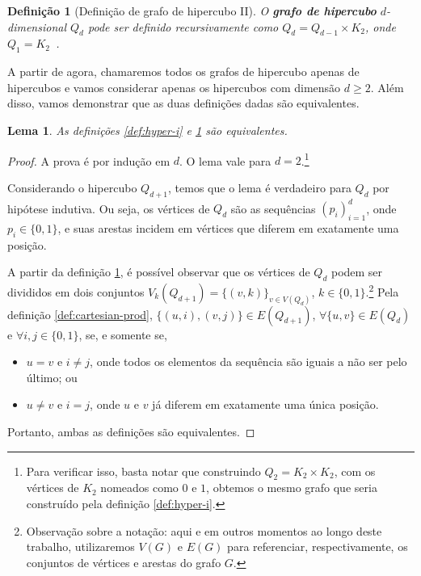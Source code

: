 \documentclass[12pt, a4paper]{article}
\newtheorem{definition}{Definição}[section]
\newtheorem{lemma}{Lema}[section]
\begin{document}
\begin{definition}[Definição de grafo de hipercubo II] \label{def:hyper-ii}
    O {\bf grafo de hipercubo} $d$-dimensional $Q_d$ pode ser definido recursivamente como $Q_d = Q_{d - 1} \times K_2$, onde $Q_1 = K_2$~\cite{harary_survey_1988}.
\end{definition}

A partir de agora, chamaremos todos os grafos de hipercubo apenas de hipercubos e vamos considerar apenas os hipercubos com dimensão $d \geq 2$. Além disso, vamos demonstrar que as duas definições dadas são equivalentes.

\begin{lemma}\label{lemma:equiv_def}
As definições \ref{def:hyper-i} e \ref{def:hyper-ii} são equivalentes.
\end{lemma}

\begin{proof}
        A prova é por indução em $d$. O lema vale para $d = 2$.\footnote{Para verificar isso, basta notar que construindo $Q_2 = K_2 \times K_2$, com os vértices de $K_2$ nomeados como $0$ e $1$, obtemos o mesmo grafo que seria construído pela definição \ref{def:hyper-i}.}

        Considerando o hipercubo $Q_{d + 1}$, temos que o lema é verdadeiro para $Q_d$ por hipótese indutiva. Ou seja, os vértices de $Q_d$ são as sequências $(p_i)_{i=1}^{d}$, onde $p_i \in \{ 0, 1 \}$, e suas arestas incidem em vértices que diferem em exatamente uma posição.

        A partir da definição \ref{def:hyper-ii}, é possível observar que os vértices de $Q_d$ podem ser divididos em dois conjuntos $V_k(Q_{d + 1}) = \{ (v, k) \}_{v \in V(Q_d)}$, $k \in \{ 0, 1 \}$.\footnote{Observação sobre a notação: aqui e em outros momentos ao longo deste trabalho, utilizaremos $V(G)$ e $E(G)$ para referenciar, respectivamente, os conjuntos de vértices e arestas do grafo $G$.} Pela definição \ref{def:cartesian-prod}, $\{ (u, i), (v, j) \} \in E(Q_{d+1})$, $\forall \{ u, v \} \in E(Q_d)$ e $\forall i, j \in \{ 0, 1 \}$, se, e somente se,
        
        \begin{itemize}
            \item $u = v$ e $i \neq j$, onde todos os elementos da sequência são iguais a não ser pelo último; ou
            \item $u \neq v$ e $i = j$, onde $u$ e $v$ já diferem em exatamente uma única posição.
        \end{itemize}

        Portanto, ambas as definições são equivalentes.
\end{proof}
\end{document}
